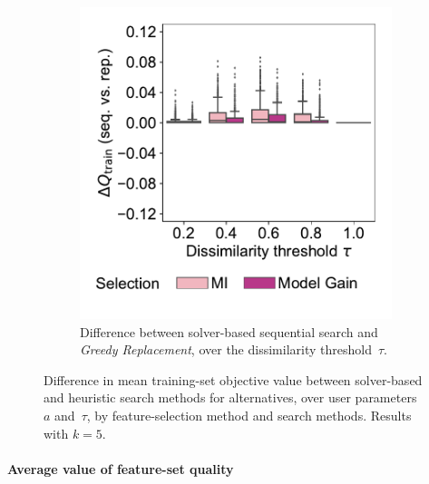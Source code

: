 \documentclass{article}
\theoremstyle{definition}
\begin{document}
\begin{figure}[p]
\begin{subfigure}[t]{0.48\textwidth}
		\includegraphics[width=\textwidth, trim=15 30 15 15, clip]{plots/afs-impact-search-heuristics-metric-diff-seq-tau.pdf}
		\caption{
			Difference between solver-based sequential search and \emph{Greedy Replacement}, over the dissimilarity threshold~$\tau$.
		}
		\label{fig:afs:impact-search-heuristics-metric-diff-seq-tau}
	\end{subfigure}
	\caption{
		Difference in mean training-set objective value between solver-based and heuristic search methods for alternatives, over user parameters~$a$ and~$\tau$, by feature-selection method and search methods.
		Results with $k=5$.
	}
	\label{fig:afs:impact-search-heuristics-metric-diff}
\end{figure}

\paragraph{Average value of feature-set quality}
\end{document}
